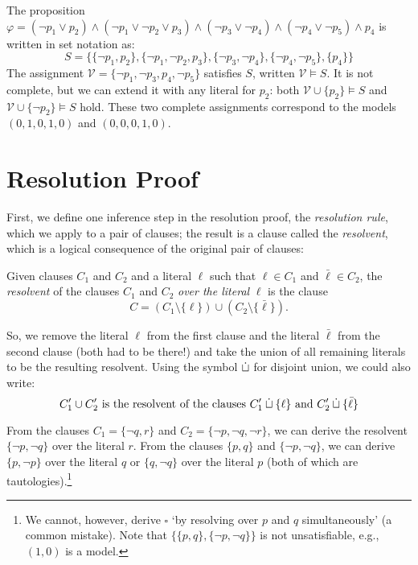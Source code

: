 \begin{example}\label{example:set-representation}
    The proposition $\varphi = (\neg p_1 \lor p_2) \land (\neg p_1 \lor \neg p_2 \lor p_3) \land (\neg p_3 \lor \neg p_4) \land (\neg p_4 \lor \neg p_5) \land p_4$ is written in set notation as:
    $$
    S = \{\{\neg p_1, p_2\}, \{\neg p_1, \neg p_2, p_3\}, \{\neg p_3, \neg p_4\}, \{\neg p_4, \neg p_5\}, \{p_4\}\}
    $$
    The assignment $\mathcal{V} = \{\neg p_1, \neg p_3, p_4, \neg p_5\}$ satisfies $S$, written $\mathcal{V} \models S$. It is not complete, but we can extend it with any literal for $p_2$: both $\mathcal{V} \cup \{p_2\} \models S$ and $\mathcal{V} \cup \{\neg p_2\} \models S$ hold. These two complete assignments correspond to the models $(0,1,0,1,0)$ and $(0,0,0,1,0)$.
\end{example}

\section{Resolution Proof}

First, we define one inference step in the resolution proof, the \emph{resolution rule}, which we apply to a pair of clauses; the result is a clause called the \emph{resolvent}, which is a logical consequence of the original pair of clauses:

\begin{definition}
    Given clauses $C_1$ and $C_2$ and a literal $\ell$ such that $\ell \in C_1$ and $\bar{\ell} \in C_2$, the \emph{resolvent} of the clauses $C_1$ and $C_2$ \emph{over the literal} $\ell$ is the clause
    $$
    C = (C_1 \setminus \{\ell\}) \cup (C_2 \setminus \{\bar{\ell}\}).
    $$
\end{definition}

So, we remove the literal $\ell$ from the first clause and the literal $\bar{\ell}$ from the second clause (both had to be there!) and take the union of all remaining literals to be the resulting resolvent. Using the symbol $\mathbin{\dot{\sqcup}}$ for disjoint union, we could also write:
$$
C_1' \cup C_2' \text{ is the resolvent of the clauses } C_1' \mathbin{\dot{\sqcup}} \{\ell\} \text{ and } C_2' \mathbin{\dot{\sqcup}} \{\bar{\ell}\}
$$

\begin{example}
    From the clauses $C_1 = \{\neg q, r\}$ and $C_2 = \{\neg p, \neg q, \neg r\}$, we can derive the resolvent $\{\neg p, \neg q\}$ over the literal $r$. From the clauses $\{p, q\}$ and $\{\neg p, \neg q\}$, we can derive $\{p, \neg p\}$ over the literal $q$ or $\{q, \neg q\}$ over the literal $p$ (both of which are tautologies).\footnote{We cannot, however, derive $\square$ `by resolving over $p$ and $q$ simultaneously' (a common mistake). Note that $\{\{p, q\}, \{\neg p, \neg q\}\}$ is not unsatisfiable, e.g., $(1,0)$ is a model.}
\end{example}

